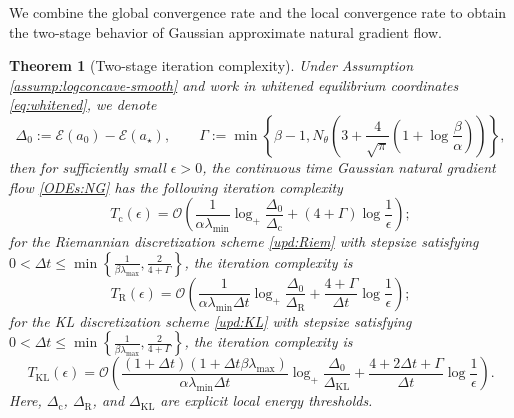 \documentclass[11pt]{article}
\theoremstyle{plain}
\newtheorem{theorem}{Theorem}[section]
\theoremstyle{definition}
\theoremstyle{remark}
\begin{document}
We combine the global convergence rate and the local convergence rate to obtain the two-stage behavior of Gaussian approximate natural gradient flow.

\begin{theorem}[Two-stage iteration complexity]
    Under Assumption \ref{assump:logconcave-smooth} and work in whitened equilibrium coordinates \eqref{eq:whitened}, we denote
    \begin{equation*}
        \Delta_0 := \mathcal{E} (a_0) - \mathcal{E} (a_\star), \qquad \Gamma := \min \left\{ \beta - 1, N_\theta \left( 3 + \frac{4}{\sqrt{\pi}} \left( 1 + \log \frac{\beta}{\alpha} \right) \right) \right\},
    \end{equation*}
    then for sufficiently small $\epsilon > 0$, the continuous time Gaussian natural gradient flow \eqref{ODEs:NG} has the following iteration complexity
    \begin{equation*}
        T_\mathrm{c} (\epsilon) = \mathcal{O} \left( \frac{1}{\alpha \lambda_{\min}} \log_+ \frac{\Delta_0}{\Delta_\mathrm{c}} + (4 + \Gamma) \log \frac{1}{\epsilon} \right);
    \end{equation*}
    for the Riemannian discretization scheme \eqref{upd:Riem} with stepsize satisfying $0 < \Delta t \leq \min \left\{ \frac{1}{\beta \lambda_{\max}}, \frac{2}{4 + \Gamma} \right\}$, the iteration complexity is
    \begin{equation*}
        T_\mathrm{R} (\epsilon) = \mathcal{O} \left( \frac{1}{\alpha \lambda_{\min} \Delta t} \log_+ \frac{\Delta_0}{\Delta_\mathrm{R}} + \frac{4 + \Gamma}{\Delta t} \log \frac{1}{\epsilon} \right);
    \end{equation*}
    for the KL discretization scheme \eqref{upd:KL} with stepsize satisfying $0 < \Delta t \leq \min \left\{ \frac{1}{\beta \lambda_{\max}}, \frac{2}{4 + \Gamma} \right\}$, the iteration complexity is 
    \begin{equation*}
        T_\mathrm{KL} (\epsilon) = \mathcal{O} \left( \frac{(1 + \Delta t) (1 + \Delta t \beta \lambda_{\max})}{\alpha \lambda_{\min} \Delta t} \log_+ \frac{\Delta_0}{\Delta_\mathrm{KL}} + \frac{4 + 2 \Delta t + \Gamma}{\Delta t} \log \frac{1}{\epsilon} \right).
    \end{equation*}
    Here, $\Delta_\mathrm{c}$, $\Delta_\mathrm{R}$, and $\Delta_\mathrm{KL}$ are explicit local energy thresholds.
\end{theorem}
\end{document}
